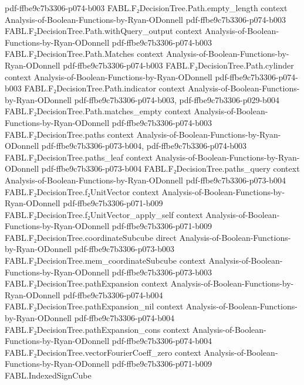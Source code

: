 \begin{theorem}
  {pdf-ffbe9c7b3306-p074-b003}
\proofstep
  {FABL.F₂DecisionTree.Path.empty_length}
  {context}
  {Analysis-of-Boolean-Functions-by-Ryan-ODonnell}
  {pdf-ffbe9c7b3306-p074-b003}
\proofstep
  {FABL.F₂DecisionTree.Path.withQuery_output}
  {context}
  {Analysis-of-Boolean-Functions-by-Ryan-ODonnell}
  {pdf-ffbe9c7b3306-p074-b003}
\proofstep
  {FABL.F₂DecisionTree.Path.Matches}
  {context}
  {Analysis-of-Boolean-Functions-by-Ryan-ODonnell}
  {pdf-ffbe9c7b3306-p074-b003}
\proofstep
  {FABL.F₂DecisionTree.Path.cylinder}
  {context}
  {Analysis-of-Boolean-Functions-by-Ryan-ODonnell}
  {pdf-ffbe9c7b3306-p074-b003}
\proofstep
  {FABL.F₂DecisionTree.Path.indicator}
  {context}
  {Analysis-of-Boolean-Functions-by-Ryan-ODonnell}
  {pdf-ffbe9c7b3306-p074-b003,
    pdf-ffbe9c7b3306-p029-b004}
\proofstep
  {FABL.F₂DecisionTree.Path.matches_empty}
  {context}
  {Analysis-of-Boolean-Functions-by-Ryan-ODonnell}
  {pdf-ffbe9c7b3306-p074-b003}
\proofstep
  {FABL.F₂DecisionTree.paths}
  {context}
  {Analysis-of-Boolean-Functions-by-Ryan-ODonnell}
  {pdf-ffbe9c7b3306-p073-b004,
    pdf-ffbe9c7b3306-p074-b003}
\proofstep
  {FABL.F₂DecisionTree.paths_leaf}
  {context}
  {Analysis-of-Boolean-Functions-by-Ryan-ODonnell}
  {pdf-ffbe9c7b3306-p073-b004}
\proofstep
  {FABL.F₂DecisionTree.paths_query}
  {context}
  {Analysis-of-Boolean-Functions-by-Ryan-ODonnell}
  {pdf-ffbe9c7b3306-p073-b004}
\proofstep
  {FABL.F₂DecisionTree.f₂UnitVector}
  {context}
  {Analysis-of-Boolean-Functions-by-Ryan-ODonnell}
  {pdf-ffbe9c7b3306-p071-b009}
\proofstep
  {FABL.F₂DecisionTree.f₂UnitVector_apply_self}
  {context}
  {Analysis-of-Boolean-Functions-by-Ryan-ODonnell}
  {pdf-ffbe9c7b3306-p071-b009}
\proofstep
  {FABL.F₂DecisionTree.coordinateSubcube}
  {direct}
  {Analysis-of-Boolean-Functions-by-Ryan-ODonnell}
  {pdf-ffbe9c7b3306-p073-b003}
\proofstep
  {FABL.F₂DecisionTree.mem_coordinateSubcube}
  {context}
  {Analysis-of-Boolean-Functions-by-Ryan-ODonnell}
  {pdf-ffbe9c7b3306-p073-b003}
\proofstep
  {FABL.F₂DecisionTree.pathExpansion}
  {context}
  {Analysis-of-Boolean-Functions-by-Ryan-ODonnell}
  {pdf-ffbe9c7b3306-p074-b004}
\proofstep
  {FABL.F₂DecisionTree.pathExpansion_nil}
  {context}
  {Analysis-of-Boolean-Functions-by-Ryan-ODonnell}
  {pdf-ffbe9c7b3306-p074-b004}
\proofstep
  {FABL.F₂DecisionTree.pathExpansion_cons}
  {context}
  {Analysis-of-Boolean-Functions-by-Ryan-ODonnell}
  {pdf-ffbe9c7b3306-p074-b004}
\proofstep
  {FABL.F₂DecisionTree.vectorFourierCoeff_zero}
  {context}
  {Analysis-of-Boolean-Functions-by-Ryan-ODonnell}
  {pdf-ffbe9c7b3306-p071-b009}
\proofstep
  {FABL.IndexedSignCube}

\end{theorem}
